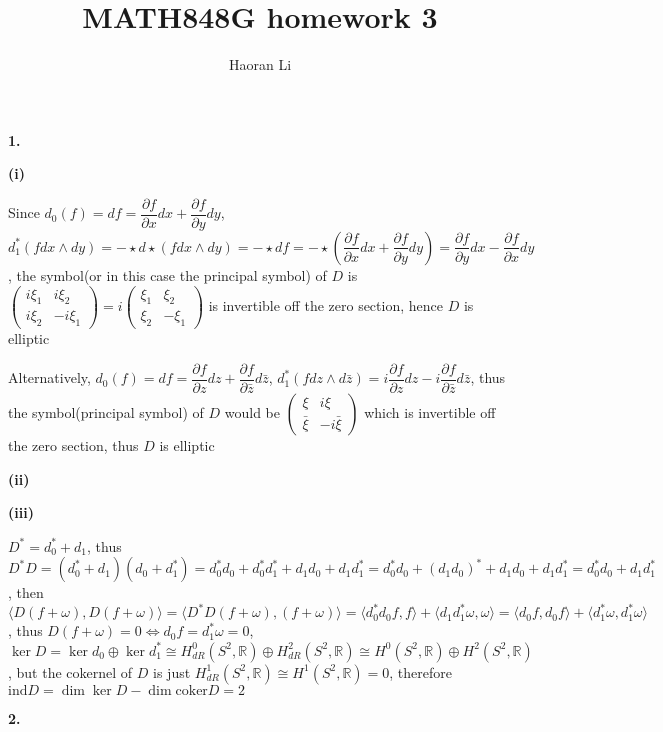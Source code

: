 \documentclass[10pt]{article}
\title{MATH848G homework 3}
\author{Haoran Li}
\date{}
\begin{document}
\maketitle
\textbf{1.} \par
\textbf{(i)} \par
Since $d_0(f)=df=\dfrac{\partial f}{\partial x}dx+\dfrac{\partial f}{\partial y}dy$, $d_1^*(fdx\wedge dy)=-\star d\star(fdx\wedge dy)=-\star df=-\star\left(\dfrac{\partial f}{\partial x}dx+\dfrac{\partial f}{\partial y}dy\right)=\dfrac{\partial f}{\partial y}dx-\dfrac{\partial f}{\partial x}dy$, the symbol(or in this case the principal symbol) of $D$ is $\begin{pmatrix}
i\xi_1 & i\xi_2 \\
i\xi_2 & -i\xi_1
\end{pmatrix}=i\begin{pmatrix}
\xi_1 & \xi_2 \\
\xi_2 & -\xi_1
\end{pmatrix}$ is invertible off the zero section, hence $D$ is elliptic \par
Alternatively, $d_0(f)=df=\dfrac{\partial f}{\partial z}dz+\dfrac{\partial f}{\partial\bar z}d\bar z$, $d_1^*(fdz\wedge d\bar z)=i\dfrac{\partial f}{\partial z}dz-i\dfrac{\partial f}{\partial \bar z}d\bar z$, thus the symbol(principal symbol) of $D$ would be $\begin{pmatrix}
\xi & i\xi \\
\bar\xi & -i\bar\xi
\end{pmatrix}$ which is invertible off the zero section, thus $D$ is elliptic \par
\textbf{(ii)} \par

\textbf{(iii)} \par
$D^*=d_0^*+d_1$, thus $D^*D=(d_0^*+d_1)(d_0+d_1^*)=d_0^*d_0+d_0^*d_1^*+d_1d_0+d_1d_1^*=d_0^*d_0+(d_1d_0)^*+d_1d_0+d_1d_1^*=d_0^*d_0+d_1d_1^*$, then $\langle D(f+\omega),D(f+\omega)\rangle=\langle D^*D(f+\omega),(f+\omega)\rangle=\langle d_0^*d_0f,f\rangle+\langle d_1d_1^*\omega,\omega\rangle=\langle d_0f,d_0f\rangle+\langle d_1^*\omega,d_1^*\omega\rangle$, thus $D(f+\omega)=0\Leftrightarrow d_0f=d_1^*\omega=0$, $\ker D=\ker d_0\oplus\ker d_1^*\cong H_{dR}^0(S^2,\mathbb R)\oplus H_{dR}^2(S^2,\mathbb R)\cong H^0(S^2,\mathbb R)\oplus H^2(S^2,\mathbb R)$, but the cokernel of $D$ is just $H_{dR}^1(S^2,\mathbb R)\cong H^1(S^2,\mathbb R)=0$, therefore $\mathrm{ind}D=\dim\ker D-\dim\mathrm{coker}D=2$ \par
\textbf{2.} \par
\end{document}
